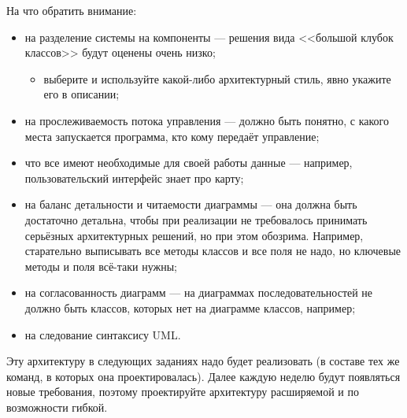 \documentclass[a5paper]{homework}
\begin{document}
На что обратить внимание:

\begin{itemize}
    \item на разделение системы на компоненты --- решения вида <<большой клубок классов>> будут оценены очень низко;
    \begin{itemize}
        \item выберите и используйте какой-либо архитектурный стиль, явно укажите его в описании;
    \end{itemize}
    \item на прослеживаемость потока управления --- должно быть понятно, с какого места запускается программа, кто кому передаёт управление;
    \item что все имеют необходимые для своей работы данные --- например, пользовательский интерфейс знает про карту;
    \item на баланс детальности и читаемости диаграммы --- она должна быть достаточно детальна, чтобы при реализации не требовалось принимать серьёзных архитектурных решений, но при этом обозрима. Например, старательно выписывать все методы классов и все поля не надо, но ключевые методы и поля всё-таки нужны;
    \item на согласованность диаграмм --- на диаграммах последовательностей не должно быть классов, которых нет на диаграмме классов, например;
    \item на следование синтаксису UML.
\end{itemize}

Эту архитектуру в следующих заданиях надо будет реализовать (в составе тех же команд, в которых она проектировалась). Далее каждую неделю будут появляться новые требования, поэтому проектируйте архитектуру расширяемой и по возможности гибкой.
\end{document}

